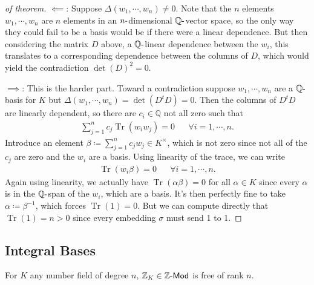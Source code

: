 \begin{proof}[of theorem]

\(\impliedby\): Suppose \(\Delta(w_1, \cdots, w_n) \neq 0\). Note that
the \(n\) elements \(w_1, \cdots, w_n\) are \(n\) elements in an
\(n{\hbox{-}}\)dimensional \({\mathbb{Q}}{\hbox{-}}\)vector space, so
the only way they could fail to be a basis would be if there were a
linear dependence. But then considering the matrix \(D\) above, a
\({\mathbb{Q}}{\hbox{-}}\)linear dependence between the \(w_i\), this
translates to a corresponding dependence between the columns of \(D\),
which would yield the contradiction \(\det(D)^2 = 0\).

\hfill\break

\(\implies\): This is the harder part. Toward a contradiction suppose
\(w_1, \cdots, w_n\) are a \({\mathbb{Q}}{\hbox{-}}\)basis for \(K\) but
\(\Delta(w_1, \cdots, w_n) = \det(D^t D) = 0\). Then the columns of
\(D^t D\) are linearly dependent, so there are \(c_i \in {\mathbb{Q}}\)
not all zero such that
\begin{align*}
\sum_{j=1}^n c_j \operatorname{Tr}( w_i w_j) = 0 && \forall i=1, \cdots, n
.\end{align*}
Introduce an element
\(\beta \coloneqq\sum_{j=1}^n c_j w_j \in K^{\times}\), which is not
zero since not all of the \(c_j\) are zero and the \(w_i\) are a basis.
Using linearity of the trace, we can write
\begin{align*}
\operatorname{Tr}(w_i \beta) = 0 && \forall i=1, \cdots, n
.\end{align*}
Again using linearity, we actually have
\(\operatorname{Tr}( \alpha \beta) = 0\) for all \(\alpha\in K\) since
every \(\alpha\) is in the \({\mathbb{Q}}{\hbox{-}}\)span of the
\(w_i\), which are a basis. It's then perfectly fine to take
\(\alpha \coloneqq\beta^{-1}\), which forces
\(\operatorname{Tr}(1) = 0\). But we can compute directly that
\(\operatorname{Tr}(1) = n > 0\) since every embedding \(\sigma\) must
send 1 to 1.

\end{proof}

\hypertarget{integral-bases}{%
\subsection{Integral Bases}\label{integral-bases}}

\begin{theorem}

For \(K\) any number field of degree \(n\),
\({\mathbb{Z}}_K \in {\mathsf{{\mathbb{Z}}}{\hbox{-}}\mathsf{Mod}}\) is
free of rank \(n\).

\end{theorem}

